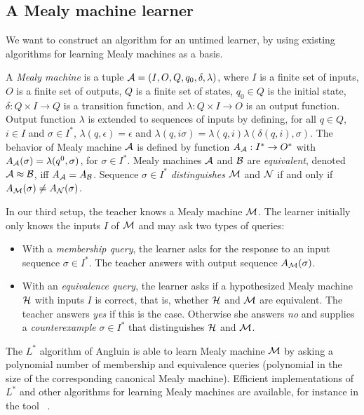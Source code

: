 \subsection{A Mealy machine learner}
We want to construct an algorithm for an untimed learner, by using existing algorithms for learning Mealy machines
as a basis.

A \emph{Mealy machine} is a tuple ${\cal A} = (I, O, Q, q_0, \delta, \lambda)$, where
$I$ is a finite set of inputs,
$O$ is a finite set of outputs,
$Q$ is a finite set of states,
$q_0 \in Q$ is the initial state,
$\delta: Q \times I \rightarrow Q$ is a transition function, and
$\lambda: Q \times I \rightarrow O$ is an output function.
%
Output function $\lambda$ is extended to sequences of inputs by defining,
for all $q \in Q$, $i \in I$ and $\sigma \in I^{\ast}$,
$\lambda(q, \epsilon) = \epsilon$ and $\lambda(q, i \sigma) = \lambda(q, i) \lambda(\delta(q, i), \sigma)$.
%
The behavior of Mealy machine ${\cal A}$ is defined by function $A_{\cal A} : I^{\ast} \rightarrow O^{\ast}$ with
$A_{\cal A}(\sigma) = \lambda (q^0, \sigma)$, for  $\sigma \in I^{\ast}$.
Mealy machines ${\cal A}$ and ${\cal B}$ are \emph{equivalent}, denoted ${\cal A} \approx {\cal B}$, iff $A_{{\cal A}} = A_{{\cal B}}$.
Sequence $\sigma \in I^{\ast}$ \emph{distinguishes}
${\cal M}$ and ${\cal N}$ if and only if $A_{{\cal M}}(\sigma) \neq A_{{\cal N}}(\sigma)$.

In our third setup, the teacher knows a Mealy machine ${\cal M}$. 
The learner initially only knows the inputs $I$ of ${\cal M}$ and may ask two types of queries:
\begin{itemize}
\item
With a \emph{membership query}, the learner asks for the response to an input sequence $\sigma \in I^{\ast}$.
The teacher answers with output sequence $A_{{\cal M}}(\sigma)$.
\item
With an \emph{equivalence query}, the learner asks if a hypothesized Mealy machine ${\cal H}$ with
inputs $I$ is correct, that is, whether ${\cal H}$ and ${\cal M}$ are equivalent.
The teacher answers \emph{yes} if this is the case. Otherwise she answers \emph{no} and supplies a
\emph{counterexample} $\sigma \in I^{\ast}$ that distinguishes ${\cal H}$ and ${\cal M}$.
\end{itemize}
The $L^{\ast}$ algorithm of Angluin \cite{Ang87} is able to learn Mealy machine ${\cal M}$ by asking a polynomial
number of membership and equivalence queries (polynomial in the size of the corresponding canonical Mealy machine).
Efficient implementations of $L^{\ast}$ and other algorithms for learning Mealy machines are available,
for instance in the tool \learnlib\ \cite{RSBM09,MertenSHM11}.

